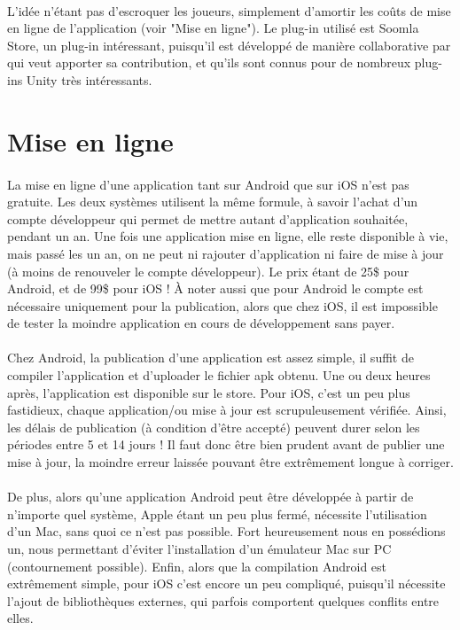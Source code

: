 \paragraph{}
L'idée n'étant pas d'escroquer les joueurs, simplement d'amortir les coûts de mise en ligne de l'application (voir "Mise en ligne"). Le plug-in utilisé est Soomla Store, un plug-in intéressant, puisqu'il est développé de manière collaborative par qui veut apporter sa contribution, et qu'ils sont connus pour de nombreux plug-ins Unity très intéressants. 

\section{Mise en ligne}

\paragraph{}
La mise en ligne d'une application tant sur Android que sur iOS n'est pas gratuite. Les deux systèmes utilisent la même formule, à savoir l'achat d'un compte développeur qui permet de mettre autant d'application souhaitée, pendant un an. Une fois une application mise en ligne, elle reste disponible à vie, mais passé les un an, on ne peut ni rajouter d'application ni faire de mise à jour (à moins de renouveler le compte développeur). Le prix étant de 25\$ pour Android, et de 99\$ pour iOS ! À noter aussi que pour Android le compte est nécessaire uniquement pour la publication, alors que chez iOS, il est impossible de tester la moindre application en cours de développement sans payer.

\paragraph{}
Chez Android, la publication d'une application est assez simple, il suffit de compiler l'application et d'uploader le fichier apk obtenu. Une ou deux heures après, l'application est disponible sur le store. Pour iOS, c'est un peu plus fastidieux, chaque application/ou mise à jour est scrupuleusement vérifiée. Ainsi, les délais de publication (à condition d'être accepté) peuvent durer selon les périodes entre 5 et 14 jours ! Il faut donc être bien prudent avant de publier une mise à jour, la moindre erreur laissée pouvant être extrêmement  longue à corriger. 

\paragraph{}
De plus, alors qu'une application Android peut être développée à partir de n'importe quel système, Apple étant un peu plus fermé, nécessite l'utilisation d'un Mac, sans quoi ce n'est pas possible. Fort heureusement nous en possédions un, nous permettant d'éviter l'installation d'un émulateur Mac sur PC (contournement possible). Enfin, alors que la compilation Android est extrêmement simple, pour iOS c'est encore un peu compliqué, puisqu'il nécessite l'ajout de bibliothèques externes, qui parfois comportent quelques conflits entre elles.

